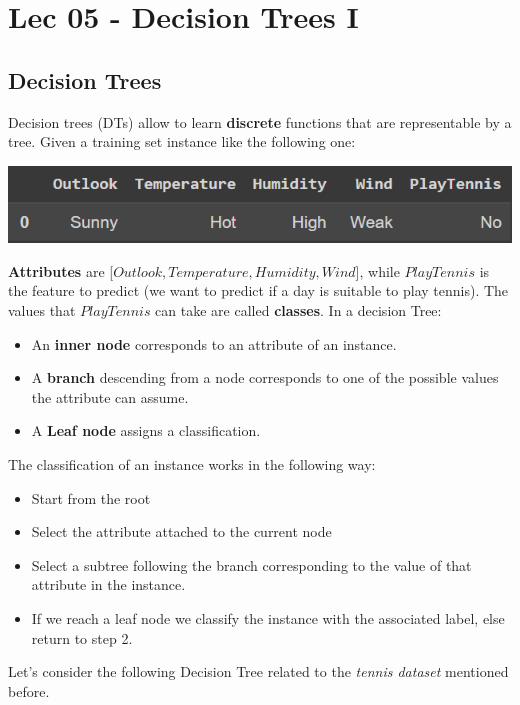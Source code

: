 \chapter{Lec 05 - Decision Trees I}

\section{Decision Trees}
Decision trees (DTs) allow to learn \textbf{discrete} functions that are representable by a tree. Given a training set instance like the following one:
\begin{center}
    \includegraphics[scale=0.7]{images/Dataset instance.png}
\end{center}
\textbf{Attributes} are [$Outlook, Temperature, Humidity, Wind$], while $PlayTennis$ is the feature to predict (we want to predict if a day is suitable to play tennis). The values that $PlayTennis$ can take are called \textbf{classes}.
In a decision Tree:
\begin{itemize}
    \item An \textbf{inner node} corresponds to an attribute of an instance.
    \item A \textbf{branch} descending from a node corresponds to one of the possible values the attribute can assume.
    \item A \textbf{Leaf node} assigns a classification.
\end{itemize}
The classification of an instance works in the following way:
\begin{itemize}
    \item Start from the root
    \item Select the attribute attached to the current node
    \item Select a subtree following the branch corresponding to the value of that attribute in the instance.
    \item If we reach a leaf node we classify the instance with the associated label, else return to step 2.
\end{itemize}
Let's consider the following Decision Tree related to the \textit{tennis dataset} mentioned before.
